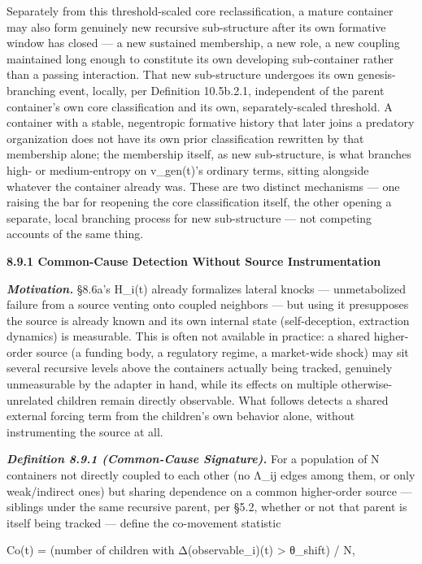 \documentclass[
]{article}
\begin{document}
Separately from this threshold-scaled core reclassification, a mature
container may also form genuinely new recursive sub-structure after its
own formative window has closed --- a new sustained membership, a new
role, a new coupling maintained long enough to constitute its own
developing sub-container rather than a passing interaction. That new
sub-structure undergoes its own genesis-branching event, locally, per
Definition 10.5b.2.1, independent of the parent container's own core
classification and its own, separately-scaled threshold. A container
with a stable, negentropic formative history that later joins a
predatory organization does not have its own prior classification
rewritten by that membership alone; the membership itself, as new
sub-structure, is what branches high- or medium-entropy on v\_gen(t)'s
ordinary terms, sitting alongside whatever the container already was.
These are two distinct mechanisms --- one raising the bar for reopening
the core classification itself, the other opening a separate, local
branching process for new sub-structure --- not competing accounts of
the same thing.

\textbf{8.9.1 Common-Cause Detection Without Source Instrumentation}

\emph{\textbf{Motivation.}} §8.6a's H\_i(t) already formalizes lateral
knocks --- unmetabolized failure from a source venting onto coupled
neighbors --- but using it presupposes the source is already known and
its own internal state (self-deception, extraction dynamics) is
measurable. This is often not available in practice: a shared
higher-order source (a funding body, a regulatory regime, a market-wide
shock) may sit several recursive levels above the containers actually
being tracked, genuinely unmeasurable by the adapter in hand, while its
effects on multiple otherwise-unrelated children remain directly
observable. What follows detects a shared external forcing term from the
children's own behavior alone, without instrumenting the source at all.

\emph{\textbf{Definition 8.9.1 (Common-Cause Signature).}} For a
population of N containers not directly coupled to each other (no Λ\_ij
edges among them, or only weak/indirect ones) but sharing dependence on
a common higher-order source --- siblings under the same recursive
parent, per §5.2, whether or not that parent is itself being tracked ---
define the co-movement statistic

Co(t) = (number of children with Δ(observable\_i)(t) \textgreater{}
θ\_shift) / N,
\end{document}
